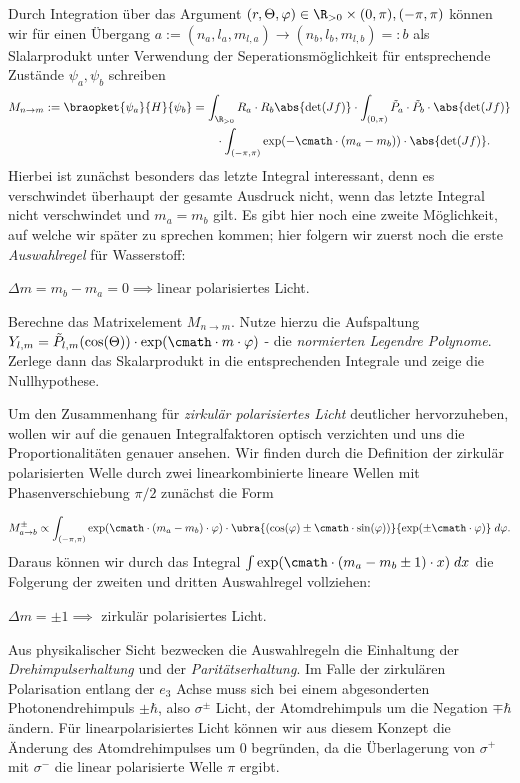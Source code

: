 \documentclass{subfile}
\begin{document}
        Durch Integration über das Argument $(r,\Theta,\varphi)\in\R_{>0}\times(0,\pi),(-\pi,\pi)$ können wir für einen Übergang $a:=(n_a,l_a,m_{l,a})\to (n_b,l_b,m_{l,b})=:b$ als Slalarprodukt unter Verwendung der Seperationsmöglichkeit für entsprechende Zustände $\psi_a,\psi_b$ schreiben
        \begin{align*}
            M_{n\to m} := \braopket{\psi_a}{H}{\psi_b} &= \int_{\R_{>0}}R_a\cdot R_b\abs{\det(Jf)} \cdot \int_{(0,\pi)}\tilde P_a\cdot\tilde P_b\cdot \abs{\det(Jf)} \\
            &\qquad\cdot \int_{(-\pi,\pi)}\exp(-\cmath\cdot(m_a - m_b))\cdot\abs{\det(Jf)}.
        \end{align*}
        Hierbei ist zunächst besonders das letzte Integral interessant, denn es verschwindet überhaupt der gesamte Ausdruck nicht, wenn das letzte Integral nicht verschwindet und $m_a = m_b$ gilt. Es gibt hier noch eine zweite Möglichkeit, auf welche wir später zu sprechen kommen; hier folgern wir zuerst noch die erste \emph{Auswahlregel} für Wasserstoff:
        \begin{center}
            $\Delta m = m_b - m_a = 0 \implies $linear polarisiertes Licht. 
        \end{center}
        \begin{Aufgabe}
            \nr{} Berechne das Matrixelement $M_{n\to m}$. Nutze hierzu die Aufspaltung $Y_{l,m} = \tilde P_{l,m}(\cos(\Theta))\cdot\exp(\cmath\cdot m\cdot\varphi)$ - die \emph{normierten Legendre Polynome}. Zerlege dann das Skalarprodukt in die entsprechenden Integrale und zeige die Nullhypothese. 
        \end{Aufgabe}
        Um den Zusammenhang für \emph{zirkulär polarisiertes Licht} deutlicher hervorzuheben, wollen wir auf die genauen Integralfaktoren optisch verzichten und uns die Proportionalitäten genauer ansehen. Wir finden durch die Definition der zirkulär polarisierten Welle durch zwei linearkombinierte lineare Wellen mit Phasenverschiebung $\pi/2$ zunächst die Form 

        \[
            M_{a\to b}^\pm \propto \int_{(-\pi,\pi)}\exp(\cmath\cdot(m_a - m_b)\cdot\varphi)\cdot \ubra{(\cos(\varphi)\pm\cmath\cdot\sin(\varphi))}{\exp(\pm\cmath\cdot\varphi)}\;d\varphi.
        \]
        Daraus können wir durch das Integral $\int \exp(\cmath\cdot (m_a - m_b \pm 1)\cdot x)\;dx$ die Folgerung der zweiten und dritten Auswahlregel vollziehen:
        \begin{center}
            $\Delta m = \pm 1 \implies$ zirkulär polarisiertes Licht.
        \end{center}
        Aus physikalischer Sicht bezwecken die Auswahlregeln die Einhaltung der \emph{Drehimpulserhaltung} und der \emph{Paritätserhaltung}. Im Falle der zirkulären Polarisation entlang der $e_3$ Achse muss sich bei einem abgesonderten Photonendrehimpuls $\pm\hbar$, also $\sigma^\pm$ Licht, der Atomdrehimpuls um die Negation $\mp\hbar$ ändern. Für linearpolarisiertes Licht können wir aus diesem Konzept die Änderung des Atomdrehimpulses um $0$ begründen, da die Überlagerung von $\sigma^+$ mit $\sigma^-$ die linear polarisierte Welle $\pi$ ergibt. 
\end{document}
